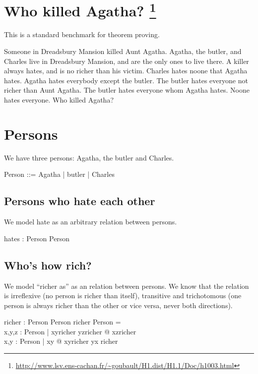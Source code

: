\documentclass{article}
\begin{document}
\usetikzlibrary{positioning}


\section*{Who killed Agatha?%
  \footnote{\url{http://www.lsv.ens-cachan.fr/~goubault/H1.dist/H1.1/Doc/h1003.html}}}

 This is a standard benchmark for theorem proving.

 Someone in Dreadsbury Mansion killed Aunt Agatha. 
 Agatha, the butler, and Charles live in Dreadsbury Mansion, and 
 are the only ones to live there. A killer always hates, and is no 
 richer than his victim. Charles hates noone that Agatha hates. Agatha 
 hates everybody except the butler. The butler hates everyone not richer 
 than Aunt Agatha. The butler hates everyone whom Agatha hates. 
 Noone hates everyone. Who killed Agatha? 

\section{Persons}
We have three persons: Agatha, the butler and Charles.
\begin{zed}
  Person ::= Agatha | butler | Charles
\end{zed}

\subsection{Persons who hate each other}
We model hate as an arbitrary relation between persons.
\begin{axdef}
  hates : Person \rel Person
\end{axdef}

\subsection{Who's how rich?}
We model ``richer as'' as an relation between persons. 
We know that the relation is irreflexive (no person is richer than itself),
transitive and trichotomous (one person is always richer than the other or
vice versa, never both directions).
\begin{axdef}
  richer : Person \rel Person
  \where
  richer \cap \id Person = \emptyset \\
  \forall x,y,z : Person | x\mapsto y\in richer \land y\mapsto z\in richer @ x\mapsto z\in richer \\
  \forall x,y : Person |  x\neq y @ x\mapsto y\in richer \iff y\mapsto x \notin richer
\end{axdef}
\end{document}
